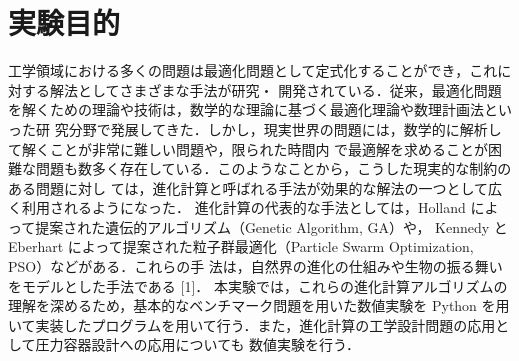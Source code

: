 \section*{実験目的}

工学領域における多くの問題は最適化問題として定式化することができ，これに対する解法としてさまざまな手法が研究・
開発されている．従来，最適化問題を解くための理論や技術は，数学的な理論に基づく最適化理論や数理計画法といった研
究分野で発展してきた．しかし，現実世界の問題には，数学的に解析して解くことが非常に難しい問題や，限られた時間内
で最適解を求めることが困難な問題も数多く存在している．このようなことから，こうした現実的な制約のある問題に対し
ては，進化計算と呼ばれる手法が効果的な解法の一つとして広く利用されるようになった．
進化計算の代表的な手法としては，Holland によって提案された遺伝的アルゴリズム（Genetic Algorithm, GA）や，
Kennedy と Eberhart によって提案された粒子群最適化（Particle Swarm Optimization, PSO）などがある．これらの手
法は，自然界の進化の仕組みや生物の振る舞いをモデルとした手法である [1]．
本実験では，これらの進化計算アルゴリズムの理解を深めるため，基本的なベンチマーク問題を用いた数値実験を Python
を用いて実装したプログラムを用いて行う．また，進化計算の工学設計問題の応用として圧力容器設計への応用についても
数値実験を行う．